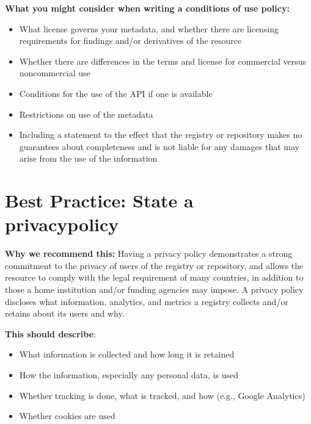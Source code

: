 \documentclass[11pt]{article}
\begin{document}
\textbf{What you might consider when writing a conditions of use policy:}

\begin{itemize}
\item What license governs your metadata, and whether there are licensing requirements for findings and/or derivatives of the resource

\item Whether there are differences in the terms and license for commercial versus noncommercial use

\item Conditions for the use of the API if one is available 

\item Restrictions on use of the metadata

\item Including a statement to the effect that the registry or repository makes no guarantees about completeness and is not liable for any damages that may arise from the use of the information

\end{itemize}


\section{Best Practice: State a privacypolicy}
\label{best-practice-state-a-privacy-policy}

\textbf{Why we recommend this:} Having a privacy policy demonstrates a strong commitment to the privacy of users of the registry or repository, and allows the resource to comply with the legal requirement of many countries, in addition to those a home institution and/or funding agencies may impose. A privacy policy discloses what information, analytics, and metrics a registry collects and/or retains about its users and why.

\textbf{This should describe}:

\begin{itemize}
\item What information is collected and how long it is retained

\item How the information, especially any personal data, is used

\item Whether tracking is done, what is tracked, and how (e.g., Google Analytics)

\item Whether cookies are used

\end{itemize}
\end{document}
